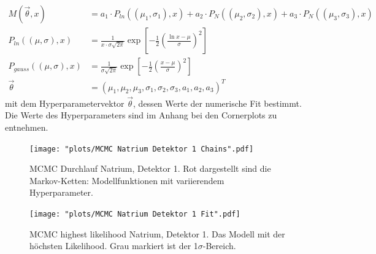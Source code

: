 \documentclass[%
aps,
onecolumn,
11pt,
tightenlines,
nofootinbib,
superscriptaddress,
floatfix,
prd,
]{revtex4-2}
\begin{document}
\begin{align}
	M(\vec{\theta}, x) &= a_1 \cdot P_{ln}((\mu_1,\sigma_1),x) + a_2 \cdot P_{N}((\mu_2,\sigma_2), x) + a_3 \cdot P_{N}((\mu_3,\sigma_3), x) \\
	P_{ln}((\mu,\sigma), x) &= \frac{1}{x \cdot \sigma \sqrt{2\pi}} \exp \left[ -\frac{1}{2} \left ( \frac{\ln x - \mu}{\sigma} \right )^2  \right] \\
    P_{gauss}((\mu,\sigma), x) &= \frac{1}{\sigma \sqrt{2\pi}} \exp \left[ -\frac{1}{2} \left( \frac{x-\mu}{\sigma} \right)^2 \right ] \\
    \vec{\theta} &= (\mu_1, \mu_2, \mu_3, \sigma_1, \sigma_2, \sigma_3, a_1, a_2, a_3)^T
\end{align}
mit dem Hyperparametervektor $\vec\theta$, dessen Werte der numerische Fit bestimmt. Die Werte des Hyperparameters sind im Anhang bei den Cornerplots zu entnehmen. 
\begin{figure}[H]
	\centering
	\texttt{[image: "plots/MCMC Natrium Detektor 1 Chains".pdf]}
	\caption{MCMC Durchlauf Natrium, Detektor 1. Rot dargestellt sind die Markov-Ketten: Modellfunktionen mit variierendem Hyperparameter.}
\end{figure}

\begin{figure}[H]
	\centering
	\texttt{[image: "plots/MCMC Natrium Detektor 1 Fit".pdf]}
	\caption{MCMC highest likelihood Natrium, Detektor 1. Das Modell mit der höchsten Likelihood. Grau markiert ist der 1$\sigma$-Bereich.}
\end{figure}
\end{document}
